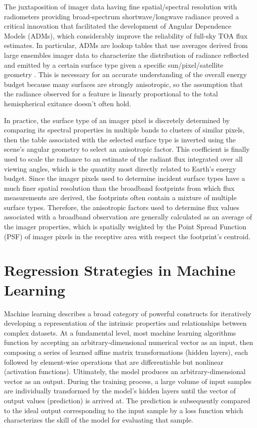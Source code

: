 \documentclass[12pt]{article}
\begin{document}
The juxtaposition of imager data having fine spatial/spectral resolution with radiometers providing broad-spectrum shortwave/longwave radiance proved a critical innovation that facilitated the development of Angular Dependence Models (ADMs), which considerably improve the reliability of full-sky TOA flux estimates. In particular, ADMs are lookup tables that use averages derived from large ensembles imager data to characterize the distribution of radiance reflected and emitted by a certain surface type given a specific sun/pixel/satellite geometry \cite{suttles_angular_1988}\cite{loeb_angular_2005}. This is necessary for an accurate understanding of the overall energy budget because many surfaces are strongly anisotropic, so the assumption that the radiance observed for a feature is linearly proportional to the total hemispherical exitance doesn't often hold.

In practice, the surface type of an imager pixel is discretely determined by comparing its spectral properties in multiple bands to clusters of similar pixels, then the table associated with the selected surface type is inverted using the scene's angular geometry to select an anisotropic factor. This coefficient is finally used to scale the radiance to an estimate of the radiant flux integrated over all viewing angles, which is the quantity most directly related to Earth's energy budget. Since the imager pixels used to determine incident surface types have a much finer spatial resolution than the broadband footprints from which flux measurements are derived, the footprints often contain a mixture of multiple surface types. Therefore, the anisotropic factors used to determine flux values associated with a broadband observation are generally calculated as an average of the imager properties, which is spatially weighted by the Point Spread Function (PSF) of imager pixels in the receptive area with respect the footprint's centroid.

\vspace{-1em}
\section{Regression Strategies in Machine Learning}
\vspace{-1em}

Machine learning describes a broad category of powerful constructs for iteratively developing a representation of the intrinsic properties and relationships between complex datasets. At a fundamental level, most machine learning algorithms function by accepting an arbitrary-dimensional numerical vector as an input, then composing a series of learned affine matrix transformations (hidden layers), each followed by element-wise operations that are differentiable but nonlinear (activation functions). Ultimately, the model produces an arbitrary-dimensional vector as an output. During the training process, a large volume of input samples are individually transformed by the model's hidden layers until the vector of output values (prediction) is arrived at. The prediction is subsequently compared to the ideal output corresponding to the input sample by a loss function which characterizes the skill of the model for evaluating that sample.
\end{document}
